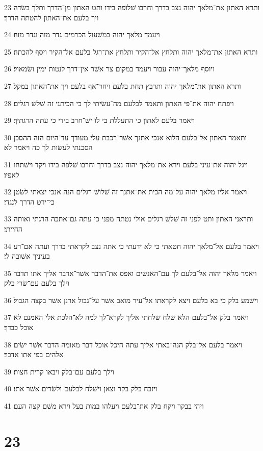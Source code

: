 \par 23 ותרא האתון את־מלאך יהוה נצב בדרך וחרבו שׁלופה בידו ותט האתון מן־הדרך ותלך בשׂדה ויך בלעם את־האתון להטתה הדרך׃
\par 24 ויעמד מלאך יהוה במשׁעול הכרמים גדר מזה וגדר מזה׃
\par 25 ותרא האתון את־מלאך יהוה ותלחץ אל־הקיר ותלחץ את־רגל בלעם אל־הקיר ויסף להכתה׃
\par 26 ויוסף מלאך־יהוה עבור ויעמד במקום צר אשׁר אין־דרך לנטות ימין ושׂמאול׃
\par 27 ותרא האתון את־מלאך יהוה ותרבץ תחת בלעם ויחר־אף בלעם ויך את־האתון במקל׃
\par 28 ויפתח יהוה את־פי האתון ותאמר לבלעם מה־עשׂיתי לך כי הכיתני זה שׁלשׁ רגלים׃
\par 29 ויאמר בלעם לאתון כי התעללת בי לו ישׁ־חרב בידי כי עתה הרגתיך׃
\par 30 ותאמר האתון אל־בלעם הלוא אנכי אתנך אשׁר־רכבת עלי מעודך עד־היום הזה ההסכן הסכנתי לעשׂות לך כה ויאמר לא׃
\par 31 ויגל יהוה את־עיני בלעם וירא את־מלאך יהוה נצב בדרך וחרבו שׁלפה בידו ויקד וישׁתחו לאפיו׃
\par 32 ויאמר אליו מלאך יהוה על־מה הכית את־אתנך זה שׁלושׁ רגלים הנה אנכי יצאתי לשׂטן כי־ירט הדרך לנגדי׃
\par 33 ותראני האתון ותט לפני זה שׁלשׁ רגלים אולי נטתה מפני כי עתה גם־אתכה הרגתי ואותה החייתי׃
\par 34 ויאמר בלעם אל־מלאך יהוה חטאתי כי לא ידעתי כי אתה נצב לקראתי בדרך ועתה אם־רע בעיניך אשׁובה לי׃
\par 35 ויאמר מלאך יהוה אל־בלעם לך עם־האנשׁים ואפס את־הדבר אשׁר־אדבר אליך אתו תדבר וילך בלעם עם־שׂרי בלק׃
\par 36 וישׁמע בלק כי בא בלעם ויצא לקראתו אל־עיר מואב אשׁר על־גבול ארנן אשׁר בקצה הגבול׃
\par 37 ויאמר בלק אל־בלעם הלא שׁלח שׁלחתי אליך לקרא־לך למה לא־הלכת אלי האמנם לא אוכל כבדך׃
\par 38 ויאמר בלעם אל־בלק הנה־באתי אליך עתה היכל אוכל דבר מאומה הדבר אשׁר ישׂים אלהים בפי אתו אדבר׃
\par 39 וילך בלעם עם־בלק ויבאו קרית חצות׃
\par 40 ויזבח בלק בקר וצאן וישׁלח לבלעם ולשׂרים אשׁר אתו׃
\par 41 ויהי בבקר ויקח בלק את־בלעם ויעלהו במות בעל וירא משׁם קצה העם׃

\chapter{23}

